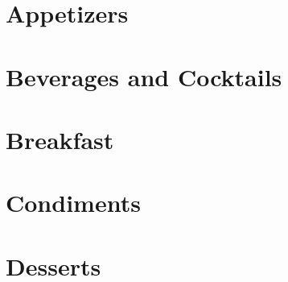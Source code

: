 \documentclass{report}
\begin{document}
    \tableofcontents

    \chapter{Appetizers}

    
    \newpage
    
    \newpage

    \chapter{Beverages and Cocktails}

    
    \newpage
    
    \newpage
    
    \newpage

    \chapter{Breakfast}

    
    \newpage
    
    \newpage
    
    \newpage
    
    \newpage

    \chapter{Condiments}

    
    \newpage
    
    \newpage
    
    \newpage
    
    \newpage
    
    \newpage
    
    \newpage

    \chapter{Desserts}

    
    \newpage
    
    \newpage
    
    \newpage
    
    \newpage
\end{document}
